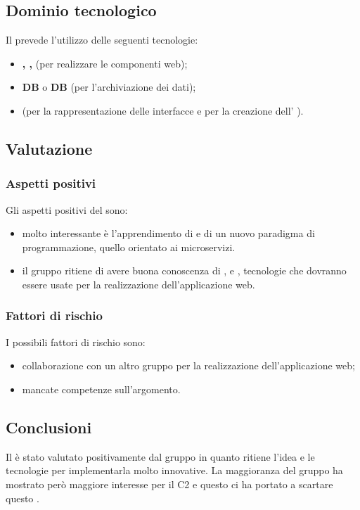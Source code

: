 	\subsection {Dominio tecnologico}
		Il  prevede l'utilizzo delle seguenti tecnologie:
		\begin {itemize}
			\item \textbf{, , } (per realizzare le componenti web);
			\item \textbf{DB } o \textbf{DB } (per l'archiviazione dei dati);
			\item \textbf{} (per la rappresentazione delle interfacce e per la creazione dell' ).
		\end {itemize}
	\subsection {Valutazione}
		\subsubsection {Aspetti positivi}
		Gli aspetti positivi del  sono:
			\begin{itemize}
				\item molto interessante è l'apprendimento di  e di un nuovo paradigma di programmazione, quello orientato ai microservizi.
				\item il gruppo ritiene di avere buona conoscenza di ,  e , tecnologie che dovranno essere usate per la realizzazione dell'applicazione web.
			\end{itemize}
		\subsubsection {Fattori di rischio}
		I possibili fattori di rischio sono:
			\begin{itemize}
				\item collaborazione con un altro gruppo per la realizzazione dell'applicazione web;
				\item mancate competenze sull'argomento.
			\end{itemize}
	\subsection {Conclusioni}
		Il  è stato valutato positivamente dal gruppo in quanto ritiene l'idea e le tecnologie per implementarla molto innovative. La maggioranza del gruppo ha mostrato però maggiore interesse
		per il  C2 e questo ci ha portato a scartare questo .
